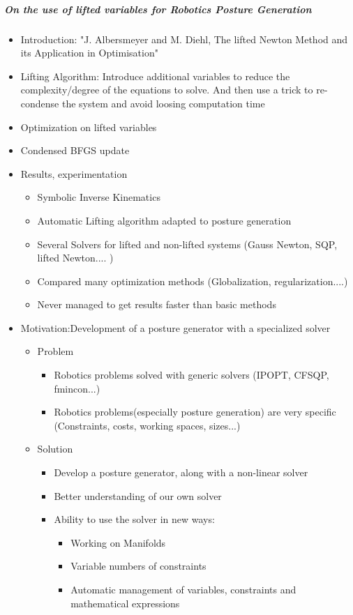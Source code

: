 \documentclass{article}
\begin{document}
\subparagraph{On the use of lifted variables for Robotics Posture Generation}
\begin{itemize}
  \item {Introduction: "J. Albersmeyer and M. Diehl, The lifted Newton Method and its Application in Optimisation"}
  \item {Lifting Algorithm: Introduce additional variables to reduce the complexity/degree of the equations to solve. And then use a trick to re-condense the system and avoid loosing computation time}
  \item {Optimization on lifted variables}
  \item {Condensed BFGS update}
  \item {Results, experimentation}
  \begin{itemize}
    \item Symbolic Inverse Kinematics
    \item Automatic Lifting algorithm adapted to posture generation
    \item Several Solvers for lifted and non-lifted systems (Gauss Newton, SQP, lifted Newton.... )
    \item Compared many optimization methods (Globalization, regularization....)
    \item Never managed to get results faster than basic methods
  \end{itemize}
  \item{Motivation:Development of a posture generator with a specialized solver}
    \begin{itemize}
      \item Problem
        \begin{itemize}
          \item Robotics problems solved with generic solvers (IPOPT, CFSQP, fmincon...)
          \item Robotics problems(especially posture generation) are very specific (Constraints, costs, working spaces, sizes...)
        \end{itemize}
      \item Solution
        \begin{itemize}
          \item Develop a posture generator, along with a non-linear solver
          \item Better understanding of our own solver
          \item Ability to use the solver in new ways:
          \begin{itemize}
            \item Working on Manifolds
            \item Variable numbers of constraints
            \item Automatic management of variables, constraints and mathematical expressions
          \end{itemize}
        \end{itemize}
    \end{itemize}
\end{itemize}
\end{document}
